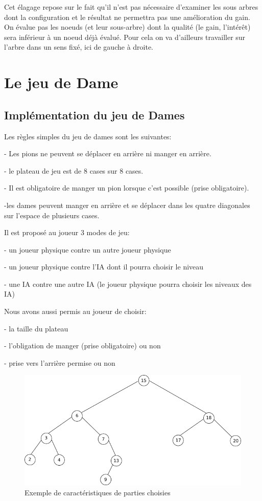 \documentclass[12,french]{report}
\begin{document}
Cet élagage repose sur le fait qu'il n'est pas nécessaire d'examiner les sous arbres dont la configuration et le résultat ne permettra pas une amélioration du gain. On évalue pas les noeuds (et leur sous-arbre) dont la qualité (le gain, l'intérêt) sera inférieur à un noeud déjà évalué. Pour cela on va d'ailleurs travailler sur l'arbre dans un sens fixé, ici de gauche à droite. 


\chapter{Le jeu de Dame}

\section{Implémentation du jeu de Dames}
Les règles simples du jeu de dames sont les suivantes:

- Les pions ne peuvent se déplacer en arrière ni manger en arrière.

- le plateau de jeu est de 8 cases sur 8 cases.

- Il est obligatoire de manger un pion lorsque c'est possible (prise obligatoire).

-les dames peuvent manger en arrière et se déplacer dans les quatre diagonales sur l'espace de plusieurs cases. 


Il est proposé au joueur 3 modes de jeu:

- un joueur physique contre un autre joueur physique

- un joueur physique contre l'IA dont il pourra choisir le niveau

- une IA contre une autre IA (le joueur physique pourra choisir les niveaux des IA)


Nous avons aussi permis au joueur de choisir:

- la taille du plateau

- l'obligation de manger (prise obligatoire) ou non

- prise vers l'arrière permise ou non

\begin{figure}[H]
	\center
	\includegraphics[width=1\textwidth]{./Images/arbre}
	\caption{Exemple de caractéristiques de parties choisies}
\end{figure}\vspace{0.2cm}
\end{document}
